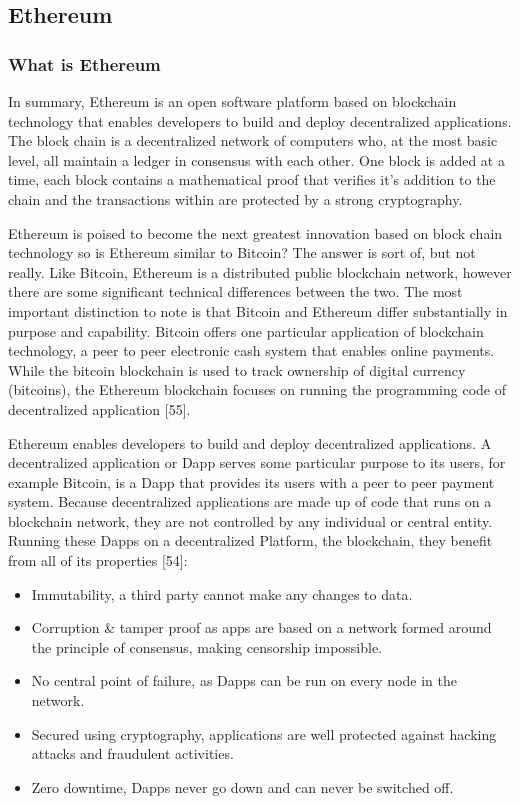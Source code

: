 \documentclass{article}
\begin{document}
\cleardoublepage
\subsection{Ethereum}
\subsubsection{What is Ethereum}
In summary, Ethereum is an open software platform based on blockchain technology that enables developers to build and deploy decentralized applications. The block chain is a decentralized network of computers who, at the most basic level, all maintain a ledger in consensus with each other. One block is added at a time, each block contains a mathematical proof that verifies it's addition to the chain and the transactions within are protected by a strong cryptography.
 
Ethereum is poised to become the next greatest innovation based on block chain technology so is Ethereum similar to Bitcoin? The answer is sort of, but not really. Like Bitcoin, Ethereum is a distributed public blockchain network, however there are some significant technical differences between the two. The most important distinction to note is that Bitcoin and Ethereum differ substantially in purpose and capability. Bitcoin offers one particular application of blockchain technology, a peer to peer electronic cash system that enables online payments. While the bitcoin blockchain is used to track ownership of digital currency (bitcoins), the Ethereum blockchain focuses on running the programming code of decentralized application {\Large [55]}.

Ethereum enables developers to build and deploy decentralized applications. A decentralized application or Dapp serves some particular purpose to its users, for example Bitcoin, is a Dapp that provides its users with a peer to peer payment system. Because decentralized applications are made up of code that runs on a blockchain network, they are not controlled by any individual or central entity. Running these Dapps on a decentralized Platform, the blockchain, they benefit from all of its properties {\Large [54]}:

\begin{itemize}
	\item Immutability, a third party cannot make any changes to data.

	\item Corruption \& tamper proof as apps are based on a network formed around the principle of consensus, making censorship impossible.

	\item No central point of failure, as Dapps can be run on every node in the network.

	\item Secured using cryptography, applications are well protected against hacking attacks and fraudulent activities.

	\item Zero downtime, Dapps never go down and can never be switched off.

\end{itemize}
\end{document}
